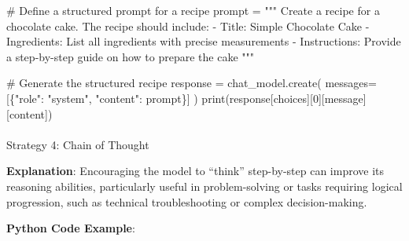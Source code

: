 \documentclass[
]{agujournal2019}
\makeatletter
\let\oldparagraph\paragraph
\renewcommand{\paragraph}{
    \@ifstar
      \xxxParagraphStar
      \xxxParagraphNoStar
  }
\newcommand{\xxxParagraphStar}[1]{\oldparagraph*{#1}\mbox{}}
\newcommand{\xxxParagraphNoStar}[1]{\oldparagraph{#1}\mbox{}}
\newenvironment{Shaded}{\begin{snugshade}}{\end{snugshade}}
\newcommand{\BuiltInTok}[1]{\textcolor[rgb]{0.00,0.23,0.31}{#1}}
\newcommand{\CommentTok}[1]{\textcolor[rgb]{0.37,0.37,0.37}{#1}}
\newcommand{\DecValTok}[1]{\textcolor[rgb]{0.68,0.00,0.00}{#1}}
\newcommand{\NormalTok}[1]{\textcolor[rgb]{0.00,0.23,0.31}{#1}}
\newcommand{\OperatorTok}[1]{\textcolor[rgb]{0.37,0.37,0.37}{#1}}
\newcommand{\StringTok}[1]{\textcolor[rgb]{0.13,0.47,0.30}{#1}}
\makeatother
\begin{document}
\begin{Shaded}
\begin{Highlighting}[]
\CommentTok{\# Define a structured prompt for a recipe}
\NormalTok{prompt }\OperatorTok{=} \StringTok{"""}
\StringTok{Create a recipe for a chocolate cake. The recipe should include:}
\StringTok{{-} Title: Simple Chocolate Cake}
\StringTok{{-} Ingredients: List all ingredients with precise measurements}
\StringTok{{-} Instructions: Provide a step{-}by{-}step guide on how to prepare the cake}
\StringTok{"""}

\CommentTok{\# Generate the structured recipe}
\NormalTok{response }\OperatorTok{=}\NormalTok{ chat\_model.create(}
\NormalTok{    messages}\OperatorTok{=}\NormalTok{[\{}\StringTok{"role"}\NormalTok{: }\StringTok{"system"}\NormalTok{, }\StringTok{"content"}\NormalTok{: prompt\}]}
\NormalTok{)}
\BuiltInTok{print}\NormalTok{(response[}\StringTok{\textquotesingle{}choices\textquotesingle{}}\NormalTok{][}\DecValTok{0}\NormalTok{][}\StringTok{\textquotesingle{}message\textquotesingle{}}\NormalTok{][}\StringTok{\textquotesingle{}content\textquotesingle{}}\NormalTok{])}
\end{Highlighting}
\end{Shaded}

\paragraph{Strategy 4: Chain of
Thought}\label{strategy-4-chain-of-thought}

\textbf{Explanation}: Encouraging the model to ``think'' step-by-step
can improve its reasoning abilities, particularly useful in
problem-solving or tasks requiring logical progression, such as
technical troubleshooting or complex decision-making.

\textbf{Python Code Example}:
\end{document}
